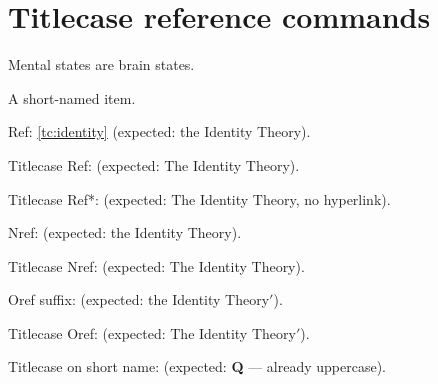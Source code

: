 \documentclass[leqno]{article}
\begin{document}
\section{Titlecase reference commands}

\begin{prop}
  \item[Identity Theory, format={the #1}]
  Mental states are brain states.
  \label{tc:identity}
  \item[Q]
  A short-named item.
  \label{tc:Q}
\end{prop}

Ref: \ref{tc:identity} (expected: the Identity Theory).

Titlecase Ref:  (expected: The Identity Theory).

Titlecase Ref*:  (expected: The Identity Theory, no hyperlink).

Nref:  (expected: the Identity Theory).

Titlecase Nref:  (expected: The Identity Theory).

Oref suffix:  (expected: the Identity Theory$'$).

Titlecase Oref:  (expected: The Identity Theory$'$).

Titlecase on short name:  (expected: \textbf{Q} --- already uppercase).
\end{document}
